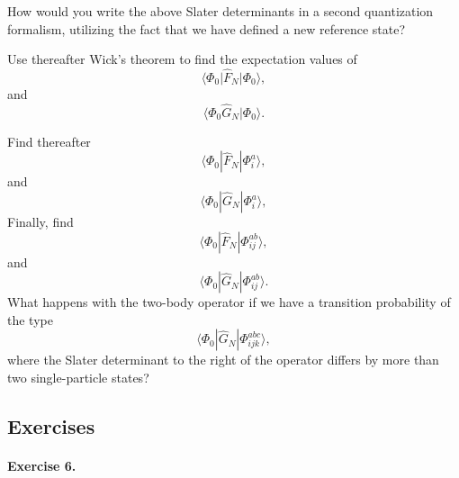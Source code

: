 \documentclass[%
twoside,                 %
final,                   %
10pt]{article}
\begin{document}
How would you write the above Slater determinants in a second quantization formalism, utilizing the fact that we have defined a new reference state? 

Use thereafter Wick's theorem to find the expectation values of 
\[
\langle \Phi_0 \vert\hat{F}_N\vert\Phi_0\rangle,
\]
and
\[
\langle \Phi_0\hat{G}_N|\Phi_0\rangle.
\]

Find thereafter 
\[
\langle \Phi_0 |\hat{F}_N|\Phi_i^a\rangle,
\]
and
\[
\langle \Phi_0|\hat{G}_N|\Phi_i^a\rangle,
\]
Finally, find
\[
\langle \Phi_0 |\hat{F}_N|\Phi_{ij}^{ab}\rangle,
\]
and
\[
\langle \Phi_0|\hat{G}_N|\Phi_{ij}^{ab}\rangle.
\]
What happens with the two-body operator if we have a transition probability  of the type
\[
\langle \Phi_0|\hat{G}_N|\Phi_{ijk}^{abc}\rangle,
\]
where the Slater determinant to the right of the operator differs by more than two single-particle states?



\subsection*{Exercises}

\paragraph{Exercise 6.}
\end{document}
